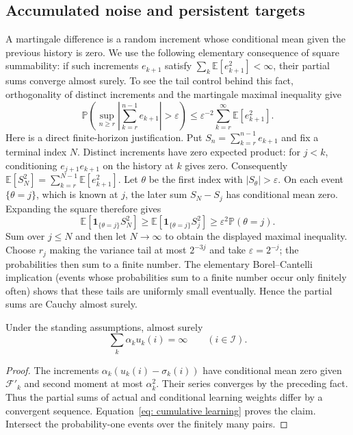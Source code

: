 \subsection{Accumulated noise and persistent targets}
A martingale difference is a random increment whose conditional mean given the previous history is zero. We use the following elementary consequence of square summability: if such increments $e_{k+1}$ satisfy $\sum_k\mathbb E[e_{k+1}^2]<\infty$, their partial sums converge almost surely. To see the tail control behind this fact, orthogonality of distinct increments and the martingale maximal inequality give
\[
\mathbb P\left(\sup_{n\ge r}\left|\sum_{k=r}^{n-1}e_{k+1}\right|>\varepsilon\right)
\le\varepsilon^{-2}\sum_{k=r}^\infty\mathbb E[e_{k+1}^2].
\]
Here is a direct finite-horizon justification. Put $S_n=\sum_{k=r}^{n-1}e_{k+1}$ and fix a terminal index $N$. Distinct increments have zero expected product: for $j<k$, conditioning $e_{j+1}e_{k+1}$ on the history at $k$ gives zero. Consequently $\mathbb E[S_N^2]=\sum_{k=r}^{N-1}\mathbb E[e_{k+1}^2]$. Let $\theta$ be the first index with $|S_\theta|>\varepsilon$. On each event $\{\theta=j\}$, which is known at $j$, the later sum $S_N-S_j$ has conditional mean zero. Expanding the square therefore gives
\[
\mathbb E[\mathbf1_{\{\theta=j\}}S_N^2]
\ge\mathbb E[\mathbf1_{\{\theta=j\}}S_j^2]
\ge\varepsilon^2\mathbb P(\theta=j).
\]
Sum over $j\le N$ and then let $N\to\infty$ to obtain the displayed maximal inequality. Choose $r_j$ making the variance tail at most $2^{-3j}$ and take $\varepsilon=2^{-j}$; the probabilities then sum to a finite number. The elementary Borel--Cantelli implication (events whose probabilities sum to a finite number occur only finitely often) shows that these tails are uniformly small eventually. Hence the partial sums are Cauchy almost surely.

\begin{lemma}\label{lem: actual learning}
Under the standing assumptions, almost surely
\[
\sum_k\alpha_k u_k(i)=\infty\qquad(i\in\mathcal I).
\]
\end{lemma}
\begin{proof}
The increments $\alpha_k(u_k(i)-\sigma_k(i))$ have conditional mean zero given $\mathcal F'_k$ and second moment at most $\alpha_k^2$. Their series converges by the preceding fact. Thus the partial sums of actual and conditional learning weights differ by a convergent sequence. Equation~\eqref{eq: cumulative learning} proves the claim. Intersect the probability-one events over the finitely many pairs.
\end{proof}

